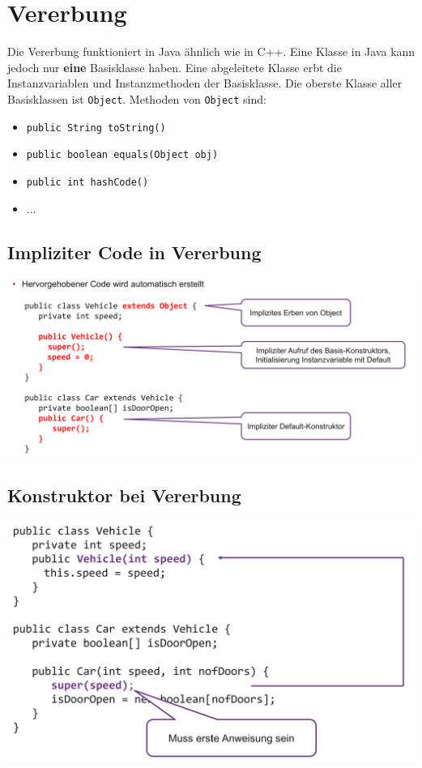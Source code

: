 \section{Vererbung}
Die Vererbung funktioniert in Java ähnlich wie in C++. Eine Klasse in Java kann jedoch nur \textbf{eine} Basisklasse haben.
Eine abgeleitete Klasse erbt die Instanzvariablen und Instanzmethoden der Basisklasse.
Die oberste Klasse aller Basisklassen ist \verb|Object|. Methoden von \verb|Object| sind:
\begin{itemize}
    \item \verb|public String toString()|
    \item \verb|public boolean equals(Object obj)|
    \item \verb|public int hashCode()|
    \item ...
\end{itemize}

\subsection{Impliziter Code in Vererbung}
\begin{center}
    \includegraphics[width=0.9\columnwidth]{pictures/vererbung-implizit.png}
\end{center}

\subsection{Konstruktor bei Vererbung}
\begin{center}
    \includegraphics[width=0.9\columnwidth]{pictures/vererbung-konstr.png}
\end{center}

